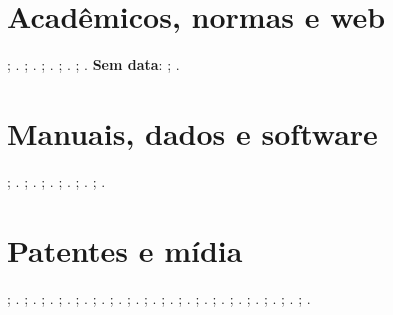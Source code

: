 \documentclass[a4paper,12pt]{article}
\begin{document}
\section*{Acadêmicos, normas e web}
\citet{thesis-1-complete}; \citep{thesis-1-complete}.
\citet{thesis-2-missing-type-institution}; \citep{thesis-2-missing-type-institution}.
\citet{std-1-complete}; \citep{std-1-complete}.
\citet{std-2-missing-organization-number}; \citep{std-2-missing-organization-number}.
\citet{online-1-with-doi}; \citep{online-1-with-doi}.
\textbf{Sem data}: \citet{online-2-url-only-no-date}; \citep{online-2-url-only-no-date}.
\section*{Manuais, dados e software}
\citet{manual-1-complete}; \citep{manual-1-complete}.
\citet{manual-2-missing-org}; \citep{manual-2-missing-org}.
\citet{dataset-1-complete-doi}; \citep{dataset-1-complete-doi}.
\citet{dataset-2-url-only}; \citep{dataset-2-url-only}.
\citet{soft-1-complete}; \citep{soft-1-complete}.
\citet{soft-2-missing-version-date}; \citep{soft-2-missing-version-date}.
\section*{Patentes e mídia}
\citet{pat-1-complete}; \citep{pat-1-complete}.
\citet{pat-2-missing-holder}; \citep{pat-2-missing-holder}.
\citet{video-1-complete}; \citep{video-1-complete}.
\citet{video-2-missing-author-has-org}; \citep{video-2-missing-author-has-org}.
\citet{audio-1-complete}; \citep{audio-1-complete}.
\citet{audio-2-missing-number}; \citep{audio-2-missing-number}.
\citet{art-obj-1-complete}; \citep{art-obj-1-complete}.
\citet{img-1-missing-author-has-org}; \citep{img-1-missing-author-has-org}.
\citet{press-1-complete}; \citep{press-1-complete}.
\citet{press-2-missing-url}; \citep{press-2-missing-url}.
\citet{letter-1-complete}; \citep{letter-1-complete}.
\citet{letter-2-missing-recipient}; \citep{letter-2-missing-recipient}.
\citet{unpub-1-complete}; \citep{unpub-1-complete}.
\citet{unpub-2-missing-date}; \citep{unpub-2-missing-date}.
\citet{interv-1-complete}; \citep{interv-1-complete}.
\citet{interv-2-missing-interviewer}; \citep{interv-2-missing-interviewer}.
\citet{misc-1-complete}; \citep{misc-1-complete}.
\citet{misc-2-missing-author-date}; \citep{misc-2-missing-author-date}.
\printbibliography[title={Referências}]
\end{document}
